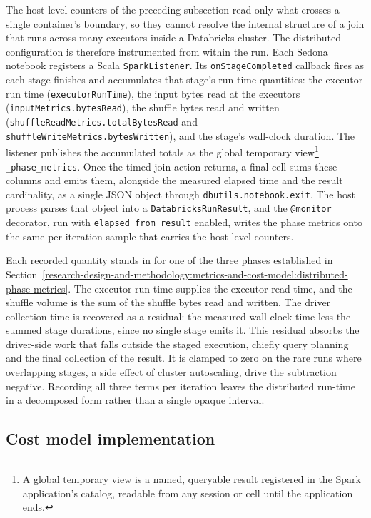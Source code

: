 The host-level counters of the preceding subsection read only what crosses a single container's boundary, so they cannot resolve the internal structure of a join that runs across many executors inside a Databricks cluster. The distributed configuration is therefore instrumented from within the run. Each Sedona notebook registers a Scala \texttt{SparkListener}. Its \texttt{onStageCompleted} callback fires as each stage finishes and accumulates that stage's run-time quantities: the executor run time (\texttt{executorRunTime}), the input bytes read at the executors (\texttt{inputMetrics.bytesRead}), the shuffle bytes read and written (\texttt{shuffleReadMetrics.totalBytesRead} and \texttt{shuffleWriteMetrics.bytesWritten}), and the stage's wall-clock duration. The listener publishes the accumulated totals as the global temporary view\footnote{A global temporary view is a named, queryable result registered in the Spark application's catalog, readable from any session or cell until the application ends.} \texttt{\_phase\_metrics}. Once the timed join action returns, a final cell sums these columns and emits them, alongside the measured elapsed time and the result cardinality, as a single JSON object through \texttt{dbutils.notebook.exit}. The host process parses that object into a \texttt{DatabricksRunResult}, and the \texttt{@monitor} decorator, run with \texttt{elapsed\_from\_result} enabled, writes the phase metrics onto the same per-iteration sample that carries the host-level counters.

Each recorded quantity stands in for one of the three phases established in Section~\ref{research-design-and-methodology:metrics-and-cost-model:distributed-phase-metrics}. The executor run-time supplies the executor read time, and the shuffle volume is the sum of the shuffle bytes read and written. The driver collection time is recovered as a residual: the measured wall-clock time less the summed stage durations, since no single stage emits it. This residual absorbs the driver-side work that falls outside the staged execution, chiefly query planning and the final collection of the result. It is clamped to zero on the rare runs where overlapping stages, a side effect of cluster autoscaling, drive the subtraction negative. Recording all three terms per iteration leaves the distributed run-time in a decomposed form rather than a single opaque interval.

\subsection{Cost model implementation}
\label{system-architecture-and-implementation:measurement-instrumentation-and-cost-model:cost-model-implementation}

